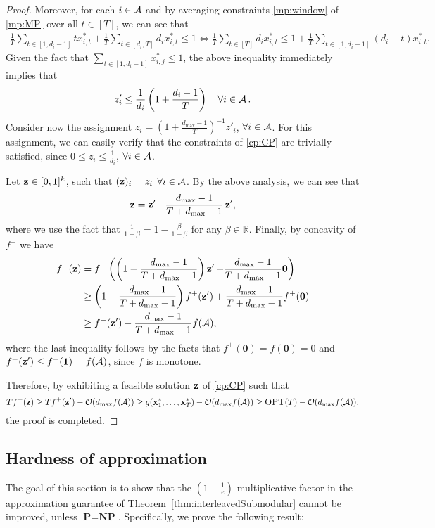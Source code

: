 \begin{proof}
Moreover, for each $i \in \operatorname{\mathcal{A}}$ and by averaging constraints \eqref{mp:window} of \eqref{mp:MP} over all $t \in [T]$, we can see that 
\begin{align*}
\frac{1}{T}\sum_{t \in [1,d_i-1]} t x^*_{i,t} + \frac{1}{T} \sum_{t \in [d_i,T]} d_i x^*_{i,t} \leq 1 \Leftrightarrow \frac{1}{T} \sum_{t \in [T]} d_i x^*_{i,t} \leq 1 + \frac{1}{T}\sum_{t \in [1,d_i-1]} (d_i - t) x^*_{i,t}. 
\end{align*}
Given the fact that $\sum_{t \in [1, d_i-1]} x^*_{i,j} \leq 1$, the above inequality immediately implies that
\begin{align*}
    z'_i \leq \frac{1}{d_i}\left(1 + \frac{d_i-1}{T} \right)\quad \forall i \in \operatorname{\mathcal{A}}.
\end{align*}
Consider now the assignment $z_i = \left(1 + \frac{d_{\max}-1}{T} \right)^{-1} z'_i$, $\forall i \in \operatorname{\mathcal{A}}$. For this assignment, we can easily verify that the constraints of \eqref{cp:CP} are trivially satisfied, since $0 \leq z_i \leq \frac{1}{d_i}$, $\forall i \in \operatorname{\mathcal{A}}$.

Let $\operatorname{\mathbf{z}} \in [0,1]^k$, such that $(\operatorname{\mathbf{z}})_i = z_i$ $\forall i \in \operatorname{\mathcal{A}}$. By the above analysis, we can see that
\begin{align*}
    \operatorname{\mathbf{z}} = \operatorname{\mathbf{z}}' - \frac{d_{\max}-1}{T + d_{\max} -1} \operatorname{\mathbf{z}}',
\end{align*}
where we use the fact that $\frac{1}{1+\beta} = 1 - \frac{\beta}{1+ \beta}$ for any $\beta \in \mathbb{R}$.
Finally, by concavity of $f^+$ we have
\begin{align*}
    f^+(\operatorname{\mathbf{z}}) &= 
    f^+\left(\left(1- \frac{d_{\max}-1}{T + d_{\max} -1} \right)\operatorname{\mathbf{z}}' + \frac{d_{\max}-1}{T + d_{\max} -1} \bm{0} \right)\\
    &\geq \left(1- \frac{d_{\max}-1}{T + d_{\max} -1} \right)f^+(\operatorname{\mathbf{z}}') + \frac{d_{\max}-1}{T + d_{\max} -1} f^+(\bm{0})\\
    &\geq f^+(\operatorname{\mathbf{z}}') - \frac{d_{\max}-1}{T + d_{\max} -1} f(\operatorname{\mathcal{A}}),
\end{align*}
where the last inequality follows by the facts that $f^+(\bm{0}) = f(\bm{0}) = 0$ and $f^+(\operatorname{\mathbf{z}}') \leq f^+(\bm{1}) = f(\operatorname{\mathcal{A}})$, since $f$ is monotone.


Therefore, by exhibiting a feasible solution $\operatorname{\mathbf{z}}$ of \eqref{cp:CP} such that 
$$
T f^+(\operatorname{\mathbf{z}}) \geq T f^+(\operatorname{\mathbf{z}}') - \mathcal{O}(d_{\max} f(\operatorname{\mathcal{A}})) \geq g(\operatorname{\mathbf{x}}^*_1, \dots, \operatorname{\mathbf{x}}^*_T) - \mathcal{O}(d_{\max} f(\operatorname{\mathcal{A}})) \geq \textsc{OPT}(T) - \mathcal{O}(d_{\max} f(\operatorname{\mathcal{A}})),
$$
the proof is completed.
\end{proof}




\subsection{Hardness of approximation}
\label{appendix:hardness}
The goal of this section is to show that the $\left(1-\frac{1}{e}\right)$-multiplicative factor in the approximation guarantee of Theorem~\ref{thm:interleavedSubmodular} cannot be improved, unless $\textbf{P} = \textbf{NP}$. Specifically, we prove the following result:

